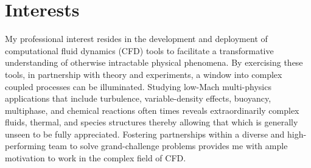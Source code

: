 \documentclass[letterpaper]{twentysecondcv_spd} %
\begin{document}
\pagestyle{headings}
\setcounter{page}{1}







\makeprofile %


\section{Interests}

My professional interest resides in the development and deployment of computational fluid dynamics (CFD)
tools to facilitate a transformative understanding 
of otherwise intractable physical phenomena. By exercising these tools, in partnership with theory and
experiments, a window into complex coupled processes can be illuminated. Studying low-Mach multi-physics 
applications that include turbulence, variable-density effects, buoyancy, multiphase, and chemical reactions often times
reveals extraordinarily complex fluids, thermal, and species structures thereby allowing that which is
generally unseen to be fully appreciated. Fostering partnerships within a diverse and high-performing 
team to solve grand-challenge problems provides me with ample motivation to work in the complex field of CFD.
\end{document}

